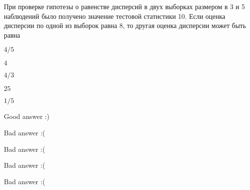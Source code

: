 
\begin{question}
При проверке гипотезы о равенстве дисперсий в двух выборках размером в 3
и 5 наблюдений было получено значение тестовой статистики 10. Если
оценка дисперсии по одной из выборок равна 8, то другая оценка дисперсии
может быть равна
\begin{answerlist}
  \item \(4/5\)
  \item \(4\)
  \item \(4/3\)
  \item \(25\)
  \item \(1/5\)
\end{answerlist}
\end{question}

\begin{solution}
\begin{answerlist}
  \item Good answer :)
  \item Bad answer :(
  \item Bad answer :(
  \item Bad answer :(
  \item Bad answer :(
\end{answerlist}
\end{solution}

